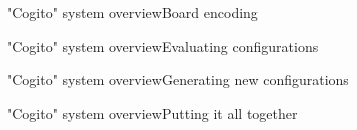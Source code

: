 \begin{frame}{"Cogito" system overview}{Board encoding}
\end{frame}

\begin{frame}{"Cogito" system overview}{Evaluating configurations}
\end{frame}

\begin{frame}{"Cogito" system overview}{Generating new configurations}
\end{frame}

\begin{frame}{"Cogito" system overview}{Putting it all together}
\end{frame}